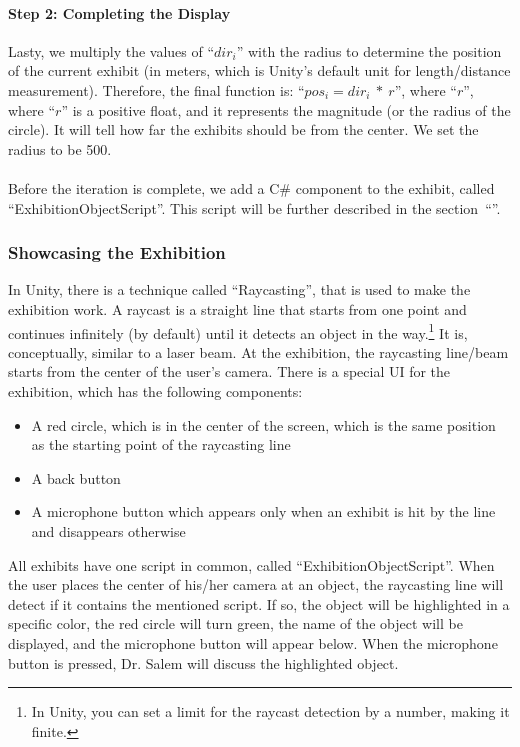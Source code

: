 \paragraph*{Step 2: Completing the Display}
Lasty, we multiply the values of “$dir_i$” with the radius to determine the position of the current exhibit (in meters, which is Unity’s default unit for length/distance measurement). Therefore, the final function is: “$pos_i = dir_i \ * \ r$”, where “$r$”, where “$r$” is a positive float, and it represents the magnitude (or the radius of the circle). It will tell how far the exhibits should be from the center. We set the radius to be 500.
\\ \\
Before the iteration is complete, we add a C\# component to the exhibit, called “ExhibitionObjectScript\normalfont”. This script will be further described in the section~“”.

\subsubsection*{Showcasing the Exhibition}
\label{ShowcasingExhibition}
In Unity, there is a technique called “Raycasting”, that is used to make the exhibition work. A raycast is a straight line that starts from one point and continues infinitely (by default) until it detects an object in the way.\footnote{In Unity, you can set a limit for the raycast detection by a number, making it finite.}  It is, conceptually, similar to a laser beam. At the exhibition, the raycasting line/beam starts from the center of the user’s camera. There is a special UI for the exhibition, which has the following components:
\begin{itemize}
    \item{A red circle, which is in the center of the screen, which is the same position as the starting point of the raycasting line}
    
    \item{A back button}
    
    \item{A microphone button which appears only when an exhibit is hit by the line and disappears otherwise}
    
\end{itemize}
All exhibits have one script in common, called “ExhibitionObjectScript\normalfont”. When the user places the center of his/her camera at an object, the raycasting line will detect if it contains the mentioned script. If so, the object will be highlighted in a specific color, the red circle will turn green, the name of the object will be displayed, and the microphone button will appear below. When the microphone button is pressed, Dr. Salem will discuss the highlighted object.

